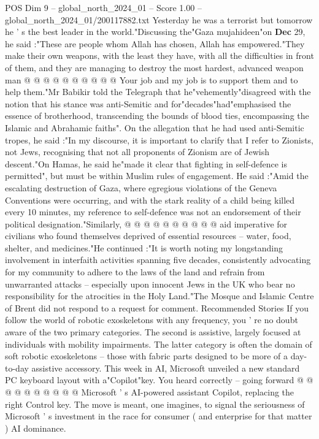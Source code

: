 \begin{textsample}{POS Dim 9 – global\_north\_2024\_01 – Score 1.00 – global\_north\_2024\_01/200117882.txt}
Yesterday he was a terrorist but tomorrow he ' s the best leader in the world."Discussing the"Gaza mujahideen"on \textbf{Dec} 29, he said :"These are people whom Allah has chosen, Allah has empowered."They make their own weapons, with the least they have, with all the difficulties in front of them, and they are managing to destroy the most hardest, advanced weapon man @ @ @ @ @ @ @ @ @ @ Your job and my job is to support them and to help them."Mr Babikir told the Telegraph that he"vehemently"disagreed with the notion that his stance was anti-Semitic and for"decades"had"emphasised the essence of brotherhood, transcending the bounds of blood ties, encompassing the Islamic and Abrahamic faiths".
On the allegation that he had used anti-Semitic tropes, he said :"In my discourse, it is important to clarify that I refer to Zionists, not Jews, recognising that not all proponents of Zionism are of Jewish descent."On Hamas, he said he"made it clear that fighting in self-defence is permitted", but must be within Muslim rules of engagement.
He said :"Amid the escalating destruction of Gaza, where egregious violations of the Geneva Conventions were occurring, and with the stark reality of a child being killed every 10 minutes, my reference to self-defence was not an endorsement of their political designation."Similarly, @ @ @ @ @ @ @ @ @ @ aid imperative for civilians who found themselves deprived of essential resources -- water, food, shelter, and medicines."He continued :"It is worth noting my longstanding involvement in interfaith activities spanning five decades, consistently advocating for my community to adhere to the laws of the land and refrain from unwarranted attacks -- especially upon innocent Jews in the UK who bear no responsibility for the atrocities in the Holy Land."The Mosque and Islamic Centre of Brent did not respond to a request for comment.
Recommended Stories If you follow the world of robotic exoskeletons with any frequency, you ' re no doubt aware of the two primary categories.
The second is assistive, largely focused at individuals with mobility impairments.
The latter category is often the domain of soft robotic exoskeletons -- those with fabric parts designed to be more of a day-to-day assistive accessory.
This week in AI, Microsoft unveiled a new standard PC keyboard layout with a"Copilot"key.
You heard correctly -- going forward @ @ @ @ @ @ @ @ @ @ Microsoft ' s AI-powered assistant Copilot, replacing the right Control key.
The move is meant, one imagines, to signal the seriousness of Microsoft ' s investment in the race for consumer ( and enterprise for that matter ) AI dominance.

\end{textsample}
